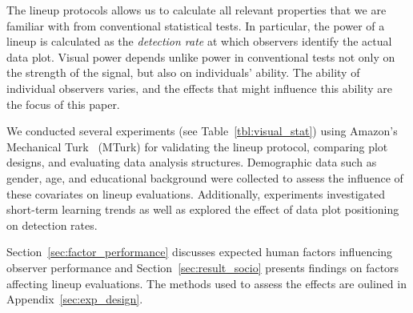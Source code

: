 \documentclass[10pt]{article}\usepackage[]{graphicx}\usepackage[]{xcolor}
\begin{document}
The lineup protocols allows us to calculate all relevant properties that we are familiar with from conventional statistical tests. In particular, the power of a lineup is calculated as the {\it detection rate} at which observers identify the actual data plot. Visual power depends unlike power in conventional tests not only on the strength of the signal, but also on individuals' ability. The ability of individual observers varies, and the effects that might influence this ability are the focus of this paper.



We conducted several experiments (see Table~\ref{tbl:visual_stat}) using Amazon's Mechanical Turk~\citep{turk} (MTurk) for validating the lineup protocol, comparing plot designs, and evaluating data analysis structures. Demographic data such as gender, age, and educational background were collected to assess the influence of these covariates on lineup evaluations. Additionally, experiments investigated short-term learning trends as well as explored the effect of data plot positioning on detection rates.
 


Section~\ref{sec:factor_performance} discusses expected human factors influencing observer performance and Section~\ref{sec:result_socio} presents findings on factors affecting lineup evaluations. The methods used to assess the effects are oulined in Appendix~\ref{sec:exp_design}. 
\end{document}
